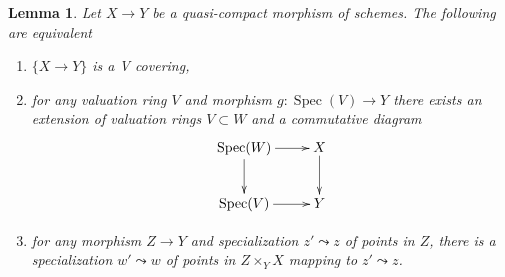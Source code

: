 \documentclass{stacks-project}
\theoremstyle{plain}
\newtheorem{lemma}[subsection]{Lemma}
\theoremstyle{definition}
\theoremstyle{remark}
\numberwithin{equation}{subsection}
\def\Spec{\mathop{\mathrm{Spec}}}
\begin{document}
\begin{lemma}
\label{lemma-refine-qcqs-V}
Let $X \to Y$ be a quasi-compact morphism of schemes.
The following are equivalent
\begin{enumerate}
\item $\{X \to Y\}$ is a V covering,
\item for any valuation ring $V$ and morphism $g : \Spec(V) \to Y$
there exists an extension of valuation rings $V \subset W$
and a commutative diagram
$$
\xymatrix{
\Spec(W) \ar[r] \ar[d] & X \ar[d] \\
\Spec(V) \ar[r] & Y
}
$$
\item for any morphism $Z \to Y$ and specialization $z' \leadsto z$
of points in $Z$, there is a specialization $w' \leadsto w$
of points in $Z \times_Y X$ mapping to $z' \leadsto z$.
\end{enumerate}
\end{lemma}
\end{document}
